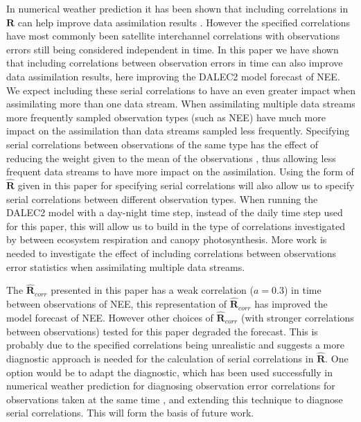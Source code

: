 \documentclass[review]{elsarticle}
\begin{document}
In numerical weather prediction it has been shown that including correlations in $\textbf{R}$ can help improve data assimilation results \citep{weston2014accounting, Stewart2013}. However the specified correlations have most commonly been satellite interchannel correlations with observations errors still being considered independent in time. In this paper we have shown that including correlations between observation errors in time can also improve data assimilation results, here improving the DALEC2 model forecast of NEE. We expect including these serial correlations to have an even greater impact when assimilating more than one data stream. When assimilating multiple data streams more frequently sampled observation types (such as NEE) have much more impact on the assimilation than data streams sampled less frequently. Specifying serial correlations between observations of the same type has the effect of reducing the weight given to the mean of the observations \citep{jarvinen1999variational}, thus allowing less frequent data streams to have more impact on the assimilation. Using the form of $\hat{\mathbf{R}}$ given in this paper for specifying serial correlations will also allow us to specify serial correlations between different observation types. When running the DALEC2 model with a day-night time step, instead of the daily time step used for this paper, this will allow us to build in the type of correlations investigated by \citet{Baldocchi2015} between ecosystem respiration and canopy photosynthesis. More work is needed to investigate the effect of including correlations between observations error statistics when assimilating multiple data streams.

The $\hat{\mathbf{R}}_{corr}$ presented in this paper has a weak correlation ($a=0.3$) in time between observations of NEE, this representation of $\hat{\mathbf{R}}_{corr}$ has improved the model forecast of NEE. However other choices of $\hat{\mathbf{R}}_{corr}$ (with stronger correlations between observations) tested for this paper degraded the forecast. This is probably due to the specified correlations being unrealistic and suggests a more diagnostic approach is needed for the calculation of serial correlations in $\hat{\mathbf{R}}$. One option would be to adapt the \citet{desroziers2005diagnosis} diagnostic, which has been used successfully in numerical weather prediction for diagnosing observation error correlations for observations taken at the same time \citep{weston2014accounting}, and extending this technique to diagnose serial correlations. This will form the basis of future work. 
\end{document}
